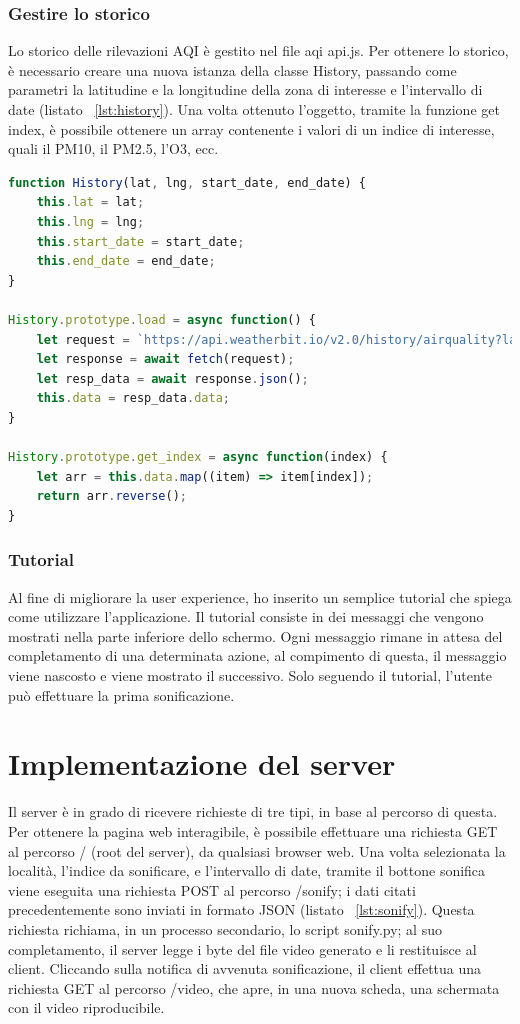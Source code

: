 \subsubsection{Gestire lo storico}
Lo storico delle rilevazioni AQI è gestito nel file aqi api.js.
Per ottenere lo storico, è necessario creare una nuova istanza della classe History, passando come parametri la latitudine e la longitudine della zona di interesse e l'intervallo di date (listato ~\ref{lst:history}).
Una volta ottenuto l'oggetto, tramite la funzione get index, è possibile ottenere un array contenente i valori di un indice di interesse, quali il PM10, il PM2.5, l'O3, ecc.
\begin{lstlisting}[language=Javascript,caption={La classe History.},label={lst:history}]
function History(lat, lng, start_date, end_date) {
    this.lat = lat;
    this.lng = lng;
    this.start_date = start_date;
    this.end_date = end_date;
}

History.prototype.load = async function() {
    let request = `https://api.weatherbit.io/v2.0/history/airquality?lat=${this.lat}&lon=${this.lng}&start_date=${this.start_date}&end_date=${this.end_date}&tz=local&key=${weatherbit_key}`;
    let response = await fetch(request);
    let resp_data = await response.json();
    this.data = resp_data.data;
}

History.prototype.get_index = async function(index) {
    let arr = this.data.map((item) => item[index]);
    return arr.reverse();
}
\end{lstlisting}

\subsubsection{Tutorial}
Al fine di migliorare la user experience, ho inserito un semplice tutorial che spiega come utilizzare l'applicazione.
Il tutorial consiste in dei messaggi che vengono mostrati nella parte inferiore dello schermo.
Ogni messaggio rimane in attesa del completamento di una determinata azione, al compimento di questa, il messaggio viene nascosto e viene mostrato il successivo.
Solo seguendo il tutorial, l'utente può effettuare la prima sonificazione.



\section{Implementazione del server}
Il server è in grado di ricevere richieste di tre tipi, in base al percorso di questa.
Per ottenere la pagina web interagibile, è possibile effettuare una richiesta GET al percorso / (root del server), da qualsiasi browser web.
Una volta selezionata la località, l'indice da sonificare, e l'intervallo di date, tramite il bottone sonifica viene eseguita una richiesta POST al percorso /sonify; i dati citati precedentemente sono inviati in formato JSON (listato ~\ref{lst:sonify}).
Questa richiesta richiama, in un processo secondario, lo script sonify.py; al suo completamento, il server legge i byte del file video generato e li restituisce al client.
Cliccando sulla notifica di avvenuta sonificazione, il client effettua una richiesta GET al percorso /video, che apre, in una nuova scheda, una schermata con il video riproducibile.

